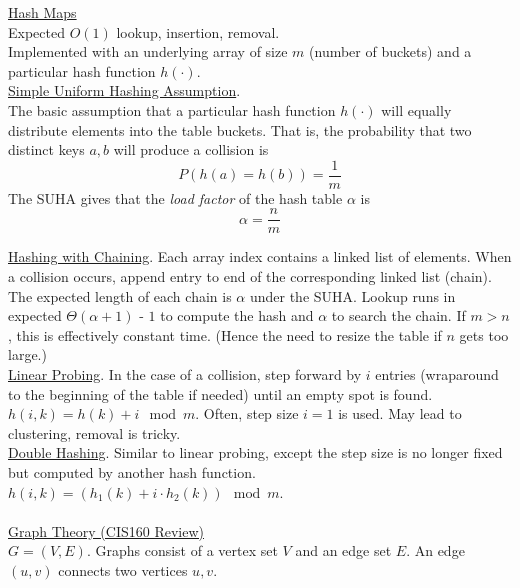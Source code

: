 \documentclass[12pt, fleqn]{general}
\begin{document}
    \begin{multicols*}{2}

    {\large \underline{Hash Maps}}\\

    Expected $O(1)$ lookup, insertion, removal.\\

    Implemented with an underlying array of size $m$ (number of buckets) and a particular hash function $h(\cdot)$.\\

    \underline{Simple Uniform Hashing Assumption}.\\ The basic assumption that a particular hash function $h(\cdot)$ will equally distribute elements into the table buckets. That is, the probability that two distinct keys $a, b$ will produce a collision is $$P(h(a) = h(b)) = \frac{1}{m}$$
    The SUHA gives that the \emph{load factor} of the hash table $\alpha$ is $$\alpha = \frac{n}{m}$$

    \underline{Hashing with Chaining}. Each array index contains a linked list of elements. When a collision occurs, append entry to end of the corresponding linked list (chain). The expected length of each chain is $\alpha$ under the SUHA. Lookup runs in expected $\Theta(\alpha + 1)$ - $1$ to compute the hash and $\alpha$ to search the chain. If $m > n$, this is effectively constant time. (Hence the need to resize the table if $n$ gets too large.)\\

    \underline{Linear Probing}. In the case of a collision, step forward by $i$ entries (wraparound to the beginning of the table if needed) until an empty spot is found. $h(i, k) = h(k) + i\mod m$. Often, step size $i=1$ is used. May lead to clustering, removal is tricky.\\

    \underline{Double Hashing}. Similar to linear probing, except the step size is no longer fixed but computed by another hash function. $h(i,k) = (h_1(k) + i\cdot h_2(k)) \mod m$.\\\\

    {\large \underline{Graph Theory (CIS160 Review)}}\\
    
    $G = (V, E)$. Graphs consist of a vertex set $V$ and an edge set $E$. An edge $(u, v)$ connects two vertices $u, v$.\\


\end{multicols*}
\end{document}
